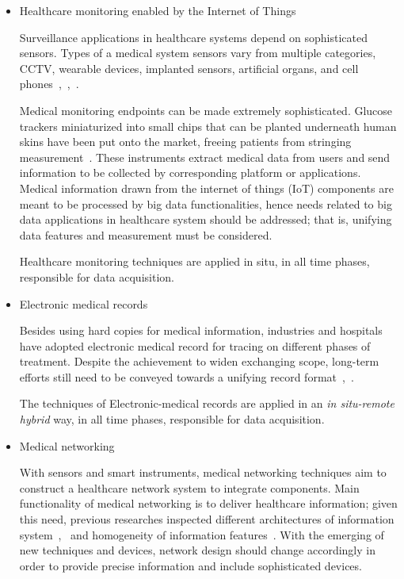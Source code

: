 \documentclass[letterpaper, twocolumn, 10pt, conference]{IEEEtran}
\begin{document}
\begin{itemize} 

\item Healthcare monitoring enabled by the Internet of Things

Surveillance applications in healthcare systems depend on sophisticated sensors. Types of a medical system sensors vary from multiple categories, CCTV, wearable devices, implanted sensors, artificial organs, and cell phones~\cite{hc_survey_12},~\cite{hc_paper_15},~\cite{hc_review_21}.

Medical monitoring endpoints can be made extremely sophisticated. Glucose trackers miniaturized into small chips that can be planted underneath human skins have been put onto the market, freeing patients from stringing measurement~\cite{hc_paper_33}. These instruments extract medical data from users and send information to be collected by corresponding platform or applications. Medical information drawn from the internet of things (IoT) components are meant to be processed by big data functionalities, hence needs related to big data applications in healthcare system should be addressed; that is, unifying data features and measurement must be considered.


Healthcare monitoring techniques are applied in situ, in all time phases, responsible for data acquisition.

\item Electronic medical records


Besides using hard copies for medical information, industries and hospitals have adopted electronic medical record for tracing on different phases of treatment. Despite the achievement to widen exchanging scope, long-term efforts still need to be conveyed towards a unifying record format~\cite{hc_survey_12},~\cite{hc_paper_14}.

The techniques of Electronic-medical records are applied in an \textit{in situ-remote hybrid} way, in all time phases, responsible for data acquisition.

\item Medical networking

With sensors and smart instruments, medical networking techniques aim to construct a healthcare network system to integrate components. Main functionality of medical networking is to deliver healthcare information; given this need, previous researches inspected different architectures of information system~\cite{hc_paper_13},~\cite{hc_paper_14} and homogeneity of information features~\cite{hc_survey_12}. 
With the emerging of new techniques and devices, network design should change accordingly in order to provide precise information and include sophisticated devices.




\end{itemize}
\end{document}
